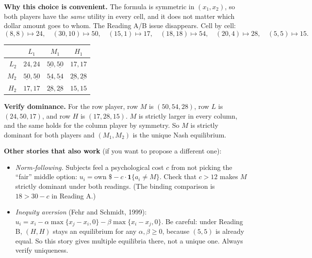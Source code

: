 \documentclass[11pt]{article}
\begin{document}
\textbf{Why this choice is convenient.} The formula is symmetric in $(x_1,x_2)$, so both players have the \emph{same} utility in every cell, and it does not matter which dollar amount goes to whom. The Reading A/B issue disappears. Cell by cell:
\[
(8,8)\mapsto 24,\quad (30,10)\mapsto 50,\quad (15,1)\mapsto 17,\quad (18,18)\mapsto 54,\quad (20,4)\mapsto 28,\quad (5,5)\mapsto 15.
\]
\begin{center}
\begin{tabular}{r|ccc}
 & $L_1$ & $M_1$ & $H_1$ \\ \hline
$L_2$ & $24,24$ & $\underline{50},\underline{50}$ & $17,17$ \\
$M_2$ & $\underline{50},\underline{50}$ & $\underline{54},\underline{54}$ & $\underline{28},\underline{28}$ \\
$H_2$ & $17,17$ & $\underline{28},\underline{28}$ & $15,15$
\end{tabular}
\end{center}
\textbf{Verify dominance.} For the row player, row $M$ is $(50,54,28)$, row $L$ is $(24,50,17)$, and row $H$ is $(17,28,15)$. $M$ is strictly larger in every column, and the same holds for the column player by symmetry. So $M$ is strictly dominant for both players and $(M_1,M_2)$ is the unique Nash equilibrium.

\textbf{Other stories that also work} (if you want to propose a different one):
\begin{itemize}
\item \emph{Norm-following.} Subjects feel a psychological cost $c$ from not picking the ``fair'' middle option: $u_i=\text{own }\$-c\cdot\mathbf{1}\{a_i\ne M\}$. Check that $c>12$ makes $M$ strictly dominant under both readings. (The binding comparison is $18>30-c$ in Reading A.)
\item \emph{Inequity aversion} (Fehr and Schmidt, 1999): $u_i=x_i-\alpha\max\{x_j-x_i,0\}-\beta\max\{x_i-x_j,0\}$. Be careful: under Reading B, $(H,H)$ stays an equilibrium for any $\alpha,\beta\ge 0$, because $(5,5)$ is already equal. So this story gives multiple equilibria there, not a unique one. Always verify uniqueness.
\end{itemize}
\end{document}

